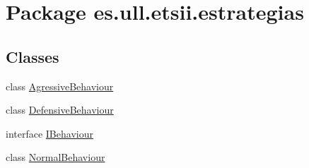 \hypertarget{namespacees_1_1ull_1_1etsii_1_1estrategias}{\section{Package es.\-ull.\-etsii.\-estrategias}
\label{namespacees_1_1ull_1_1etsii_1_1estrategias}
}
\subsection*{Classes}
\begin{DoxyCompactItemize}
\item 
class \hyperlink{classes_1_1ull_1_1etsii_1_1estrategias_1_1_agressive_behaviour}{Agressive\-Behaviour}
\item 
class \hyperlink{classes_1_1ull_1_1etsii_1_1estrategias_1_1_defensive_behaviour}{Defensive\-Behaviour}
\item 
interface \hyperlink{interfacees_1_1ull_1_1etsii_1_1estrategias_1_1_i_behaviour}{I\-Behaviour}
\item 
class \hyperlink{classes_1_1ull_1_1etsii_1_1estrategias_1_1_normal_behaviour}{Normal\-Behaviour}
\end{DoxyCompactItemize}

